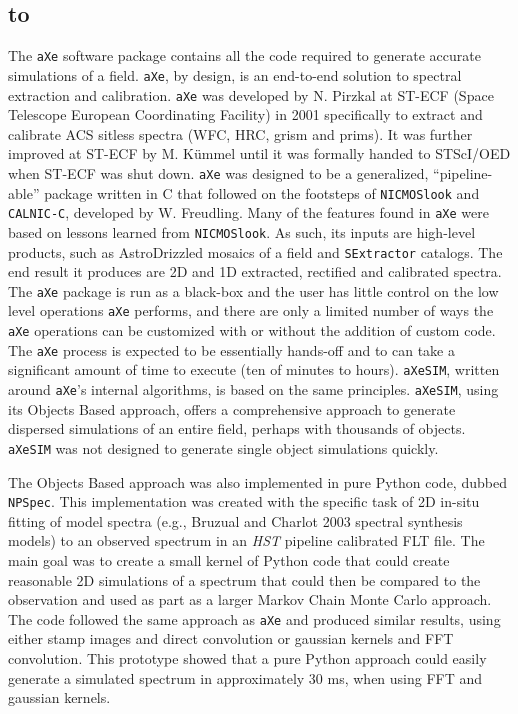 \documentclass[12pt]{article}
\def\ssubsection#1{\subsection{\hbox to \hsize{#1\hfill}}}
\begin{document}
\ssubsection{``\texttt{aXe}/\texttt{aXeSIM}/\texttt{NPSpec}''} \label{sec:npspec}
The \texttt{aXe} software package contains all the code required to generate accurate simulations of a field. \texttt{aXe}, by design, is an end-to-end solution to spectral extraction and calibration. 
\texttt{aXe} was developed by N. Pirzkal at ST-ECF (Space Telescope European Coordinating Facility) in 2001 specifically to extract and calibrate ACS sitless spectra (WFC, HRC, grism and prims). It was further improved at ST-ECF by M. K\"{u}mmel until it was formally handed to STScI/OED  when ST-ECF was shut down. \texttt{aXe} was designed to be a generalized, ``pipeline-able'' package written in C that followed on the footsteps of \texttt{NICMOSlook} and \texttt{CALNIC-C}, developed by W. Freudling. Many of the features found in \texttt{aXe} were based on lessons learned from \texttt{NICMOSlook}.
As such, its inputs are high-level products, such as AstroDrizzled mosaics of a field and \texttt{SExtractor} catalogs. The end result it produces are 2D and 1D extracted, rectified and calibrated spectra. The \texttt{aXe} package is run as a black-box and the user has little control on the low level operations \texttt{aXe} performs, and there are only a limited number of ways the \texttt{aXe} operations can be customized with or without the addition of custom code. The \texttt{aXe} process is expected to be essentially hands-off and to can take a significant amount of time to execute (ten of minutes to hours).  \texttt{aXeSIM}, written around  \texttt{aXe}'s internal algorithms, is based on the same principles. \texttt{aXeSIM}, using its Objects Based approach, offers a comprehensive approach to generate dispersed simulations of an entire field, perhaps with thousands of objects.  \texttt{aXeSIM} was not designed to generate single object simulations quickly.

The Objects Based approach was also implemented in pure Python code, dubbed \texttt{NPSpec}. This implementation was created with the specific task of 2D in-situ fitting of model spectra (e.g., Bruzual and Charlot 2003 spectral synthesis models) to an observed spectrum in an \textit{HST} pipeline calibrated FLT file. The main goal was to create a small kernel of Python code that could create reasonable 2D simulations of a spectrum that could then be compared to the observation and used as part as a larger Markov Chain Monte Carlo approach. The code followed the same approach as \texttt{aXe} and produced similar results, using either stamp images and direct convolution or gaussian kernels and FFT convolution. This prototype showed that a pure Python approach could easily generate a simulated spectrum in approximately 30 ms, when using FFT and gaussian kernels.
\end{document}

